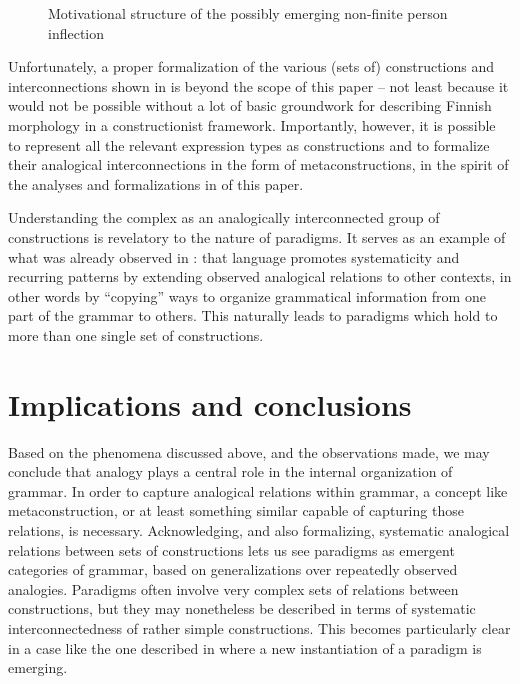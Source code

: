 \documentclass[output=paper, colorlinks,citecolor=brown]{langsci/langscibook}
\begin{document}
\begin{figure}


    \caption{Motivational structure of the possibly emerging non-finite person inflection}
    \label{fig:leino_fig12}
\end{figure}

Unfortunately, a proper formalization of the various (sets of) constructions and interconnections shown in  is beyond the scope of this paper -- not least because it would not be possible without a lot of basic groundwork for describing Finnish morphology in a constructionist framework. Importantly, however, it is possible to represent all the relevant expression types as constructions and to formalize their analogical interconnections in the form of metaconstructions, in the spirit of the analyses and formalizations in  of this paper.

Understanding the complex  as an analogically interconnected group of constructions is revelatory to the nature of paradigms. It serves as an example of what was already observed in : that language promotes systematicity and recurring patterns by extending observed analogical relations to other contexts, in other words by “copying” ways to organize grammatical information from one part of the grammar to others. This naturally leads to paradigms which hold to more than one single set of constructions.

\section{Implications and conclusions} \label{leino_sec5}

Based on the phenomena discussed above, and the observations made, we may conclude that analogy plays a central role in the internal organization of grammar. In order to capture analogical relations within grammar, a concept like metaconstruction, or at least something similar capable of capturing those relations, is necessary. Acknowledging, and also formalizing, systematic analogical relations between sets of constructions lets us see paradigms as emergent categories of grammar, based on generalizations over repeatedly observed analogies. Paradigms often involve very complex sets of relations between constructions, but they may nonetheless be described in terms of systematic interconnectedness of rather simple constructions. This becomes particularly clear in a case like the one described in  where a new instantiation of a paradigm is emerging.
\end{document}
